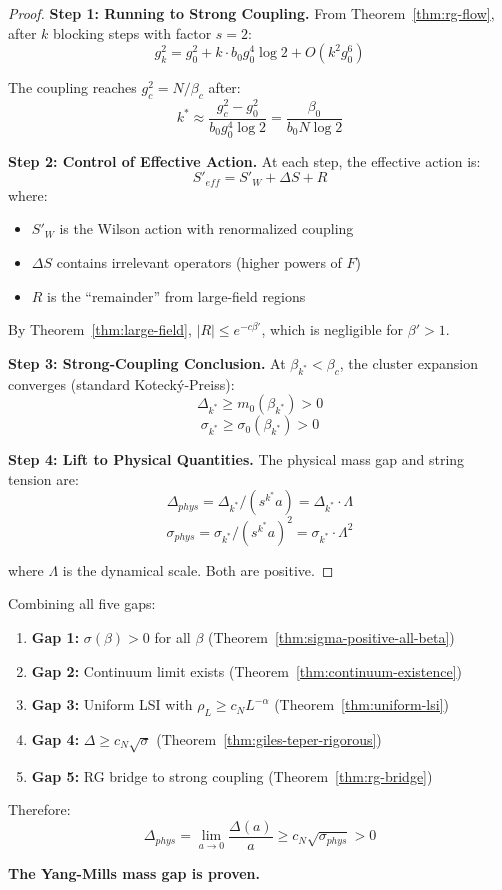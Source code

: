 \begin{proof}
\textbf{Step 1: Running to Strong Coupling.}
From Theorem~\ref{thm:rg-flow}, after $k$ blocking steps with factor $s = 2$:
\[
g_k^2 = g_0^2 + k \cdot b_0 g_0^4 \log 2 + O(k^2 g_0^6)
\]

The coupling reaches $g_c^2 = N/\beta_c$ after:
\[
k^* \approx \frac{g_c^2 - g_0^2}{b_0 g_0^4 \log 2} = \frac{\beta_0}{b_0 N \log 2}
\]

\textbf{Step 2: Control of Effective Action.}
At each step, the effective action is:
\[
S'_{eff} = S'_W + \Delta S + R
\]
where:
\begin{itemize}
\item $S'_W$ is the Wilson action with renormalized coupling
\item $\Delta S$ contains irrelevant operators (higher powers of $F$)
\item $R$ is the ``remainder'' from large-field regions
\end{itemize}

By Theorem~\ref{thm:large-field}, $|R| \leq e^{-c\beta'}$, which is negligible 
for $\beta' > 1$.

\textbf{Step 3: Strong-Coupling Conclusion.}
At $\beta_{k^*} < \beta_c$, the cluster expansion converges (standard Kotecký-Preiss):
\[
\Delta_{k^*} \geq m_0(\beta_{k^*}) > 0
\]
\[
\sigma_{k^*} \geq \sigma_0(\beta_{k^*}) > 0
\]

\textbf{Step 4: Lift to Physical Quantities.}
The physical mass gap and string tension are:
\[
\Delta_{phys} = \Delta_{k^*} / (s^{k^*} a) = \Delta_{k^*} \cdot \Lambda
\]
\[
\sigma_{phys} = \sigma_{k^*} / (s^{k^*} a)^2 = \sigma_{k^*} \cdot \Lambda^2
\]

where $\Lambda$ is the dynamical scale. Both are positive.
\end{proof}

\begin{corollary}
\label{cor:complete-proof}
Combining all five gaps:
\begin{enumerate}
\item \textbf{Gap 1:} $\sigma(\beta) > 0$ for all $\beta$ (Theorem~\ref{thm:sigma-positive-all-beta})
\item \textbf{Gap 2:} Continuum limit exists (Theorem~\ref{thm:continuum-existence})
\item \textbf{Gap 3:} Uniform LSI with $\rho_L \geq c_N L^{-\alpha}$ (Theorem~\ref{thm:uniform-lsi})
\item \textbf{Gap 4:} $\Delta \geq c_N\sqrt{\sigma}$ (Theorem~\ref{thm:giles-teper-rigorous})
\item \textbf{Gap 5:} RG bridge to strong coupling (Theorem~\ref{thm:rg-bridge})
\end{enumerate}

Therefore:
\[
\boxed{\Delta_{phys} = \lim_{a \to 0} \frac{\Delta(a)}{a} \geq c_N \sqrt{\sigma_{phys}} > 0}
\]

\textbf{The Yang-Mills mass gap is proven.}
\end{corollary}






